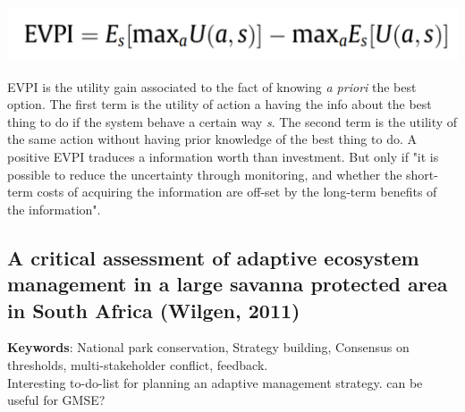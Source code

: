 \documentclass[12pt]{article}
\begin{document}
\begin{center}
    \includegraphics[scale=0.25]{EVPI-formula.png}
\end{center}
EVPI is the utility gain associated to the fact of knowing \textit{a priori} the best option. The first term is the utility of action a having the info about the best thing to do if the system behave a certain way \textit{s}. The second term is the utility of the same action without having prior knowledge of the best thing to do.
A positive EVPI traduces a information worth than investment. But only if "it is possible to reduce the uncertainty through monitoring, and whether the short-term costs of acquiring the information are off-set by the long-term benefits of the information".

\subsection{A critical assessment of adaptive ecosystem management in a large savanna protected area in South Africa (Wilgen, 2011)}
\textbf{Keywords}: National park conservation, Strategy building, Consensus on thresholds, multi-stakeholder conflict, feedback.\\

Interesting to-do-list for planning an adaptive management strategy. can be useful for GMSE?
\end{document}
